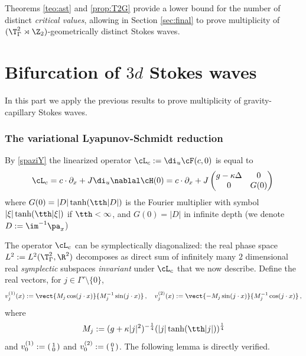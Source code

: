 \documentclass[11pt,a4paper,reqno]{article}
\numberwithin{equation}{section}
\theoremstyle{definition}
\begin{document}
Theorems \ref{teo:ast}  
and \ref{prop:T2G}
provide a lower bound for the number of distinct {\it critical values}, allowing in Section \ref{sec:final}
to prove
multiplicity  of 
$ ( \T^2_\Gamma \rtimes \Z_2 ) $-geometrically distinct Stokes waves. 


\part{Bifurcation of $3d$ Stokes waves}
\label{part:II}

In this part we apply the previous  results to prove  multiplicity 
of  gravity-capillary Stokes waves.  



\section{The variational Lyapunov-Schmidt reduction}\label{sec:LS}
By \eqref{spaziY}
the linearized operator $\cL_c:=
\di_u \cF (c, 0)$  is equal to  
$$
    \cL_c= c \cdot \partial_x + J\di_u \nablal \cH(0)=c\cdot \partial_x +J\left(\begin{matrix}
            g -\kappa \Delta & 0 \\
            0                & G(0)
        \end{matrix}\right)\, 
$$
where  $ G(0) = |D|\tanh(\tth |D| ) $ is the Fourier multiplier 
with symbol $|\xi| \tanh (\tth |\xi| )$ 
if $ \tth < \infty $, and 
$ G(0) = |D| $ in infinite depth
(we denote  
$ D := \im^{-1} \pa_x  $)


The operator $\cL_c $ can be  symplectically 
diagonalized:  
the real phase space 
$ L^2  := L^2 (\T^2_\Gamma, \R^2 )  $  decomposes as  direct sum of infinitely many $ 2 $ dimensional real  {\it symplectic}  subspaces {\it invariant} 
under $ \cL_c $ that we now describe. 
Define  the  real vectors, for $ j \in \Gamma'\setminus\{0\}$, 
\begin{equation}\label{symplectic base}
        v_j^{(1)}(x):=  \vect{M_j\cos(j\cdot x)}{M_{j}^{-1} \sin(j \cdot x)} \, , \quad 
        v_j^{(2)}(x):= \vect{-M_j\sin(j \cdot x)}{M_{j}^{-1}\cos(j \cdot x)}\, ,
\end{equation}
where \begin{equation}\label{eq:Mj}
    M_j  := (g + \kappa |j|^2)^{-\frac14}(|j | \tanh (\tth |j|))^{\frac14}
\end{equation} 
and 
$ v_0^{(1)}:= 
    \begin{psmallmatrix}
    1 \\ 0
    \end{psmallmatrix} $ 
    and $ v_0^{(2)}:= 
    \begin{psmallmatrix} 0 \\ 1
    \end{psmallmatrix} $.
The following lemma is directly verified. 
\end{document}
